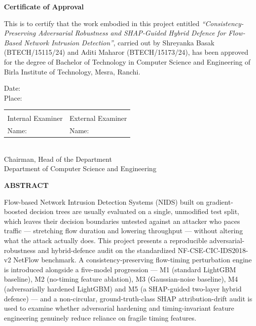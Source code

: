 \documentclass[12pt,a4paper]{report}
\begin{document}
\begin{center}\bfseries\Large Certificate of Approval\end{center}
\vspace{0.5cm}
This is to certify that the work embodied in this project entitled \textit{``Consistency-Preserving Adversarial Robustness and SHAP-Guided Hybrid Defence for Flow-Based Network Intrusion Detection''}, carried out by Shreyanka Basak (BTECH/15115/24) and Aditi Maharor (BTECH/15173/24), has been approved for the degree of Bachelor of Technology in Computer Science and Engineering of Birla Institute of Technology, Mesra, Ranchi.
\vspace{2cm}

\noindent Date: \hrulefill\\
Place: \hrulefill
\vspace{2cm}

\noindent\begin{tabular}{p{}p{}}
\hrulefill & \hrulefill \\
Internal Examiner & External Examiner \\
Name: \hrulefill & Name: \hrulefill \\
\end{tabular}
\vspace{2cm}
\begin{center}
\hrulefill\\
Chairman, Head of the Department\\
Department of Computer Science and Engineering
\end{center}
\newpage

\begin{center}\textbf{ABSTRACT}\end{center}\vspace{4pt}
Flow-based Network Intrusion Detection Systems (NIDS) built on gradient-boosted decision trees are usually evaluated on a single, unmodified test split, which leaves their decision boundaries untested against an attacker who paces traffic --- stretching flow duration and lowering throughput --- without altering what the attack actually does. This project presents a reproducible adversarial-robustness and hybrid-defence audit on the standardized NF-CSE-CIC-IDS2018-v2 NetFlow benchmark. A consistency-preserving flow-timing perturbation engine is introduced alongside a five-model progression --- M1 (standard LightGBM baseline), M2 (no-timing feature ablation), M3 (Gaussian-noise baseline), M4 (adversarially hardened LightGBM) and M5 (a SHAP-guided two-layer hybrid defence) --- and a non-circular, ground-truth-class SHAP attribution-drift audit is used to examine whether adversarial hardening and timing-invariant feature engineering genuinely reduce reliance on fragile timing features.
\end{document}
